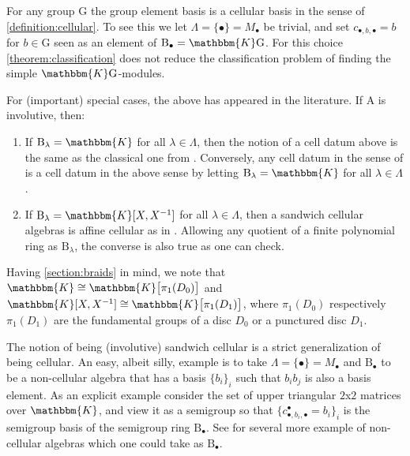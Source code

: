 \documentclass[a4paper,11pt]{amsart}
\newcommand{\setstuff}[1]{\mathrm{#1}}
\newcommand{\KK}{\mathbbm{K}}
\numberwithin{equation}{section}
\let\fullref\autoref
\begin{document}
\begin{example}\label{example:groups}
For any group $\setstuff{G}$ the group element basis 
is a cellular basis in the sense of \fullref{definition:cellular}. 
To see this we let $\Lambda=\{\bullet\}=M_{\bullet}$ be trivial,
and set $c_{\bullet,b,\bullet}=b$ for $b\in\setstuff{G}$
seen as an element of $\setstuff{B}_{\bullet}=\KK\setstuff{G}$.
For this choice \fullref{theorem:classification} 
does not reduce the classification 
problem of finding the simple $\KK\setstuff{G}$-modules.
\end{example}

\begin{example}
For (important) special cases, the above has appeared in the literature. 
If $\setstuff{A}$ is involutive, then:
\begin{enumerate}

\item If $\setstuff{B}_{\lambda}=\KK$ for all $\lambda\in\Lambda$, 
then the notion of a cell datum above is the same as 
the classical one from \cite{GrLe-cellular}. Conversely, any cell datum in 
the sense of \cite{GrLe-cellular} is a cell datum in the above sense 
by letting $\setstuff{B}_{\lambda}=\KK$ for all $\lambda\in\Lambda$.

\item If $\setstuff{B}_{\lambda}=\KK[X,X^{-1}]$ 
for all $\lambda\in\Lambda$, 
then a sandwich cellular algebras is affine cellular 
as in \cite{KoXi-affine-cellular}. Allowing 
any quotient of a finite polynomial ring as $\setstuff{B}_{\lambda}$, 
the converse is also true as one can check.

\end{enumerate}
Having \fullref{section:braids} in mind,
we note that $\KK\cong\KK\big[\pi_{1}(D_{0})\big]$ 
and $\KK[X,X^{-1}]\cong\KK\big[\pi_{1}(D_{1})\big]$,
where $\pi_{1}(D_{0})$ respectively $\pi_{1}(D_{1})$
are the fundamental groups of a disc 
$D_{0}$ or a punctured disc $D_{1}$.
\end{example}

\begin{example}\label{example:sandwich}
The notion of being (involutive) sandwich cellular 
is a strict generalization of 
being cellular. An easy, albeit silly, example is to take 
$\Lambda=\{\bullet\}=M_{\bullet}$ and $\setstuff{B}_{\bullet}$
to be a non-cellular algebra
that has a basis $\{b_{i}\}_{i}$ such that $b_{i}b_{j}$ is 
also a basis element. As an explicit example 
consider the set of upper triangular 
$2$x$2$ matrices over $\KK$, and view it as a semigroup 
so that $\{c_{\bullet,b_{i},\bullet}^{\bullet}=b_{i}\}_{i}$ 
is the semigroup basis of the semigroup ring 
$\setstuff{B}_{\bullet}$.
See \cite{EhTu-relcell} for several more example of non-cellular algebras
which one could take as $\setstuff{B}_{\bullet}$.
\end{example}
\end{document}
